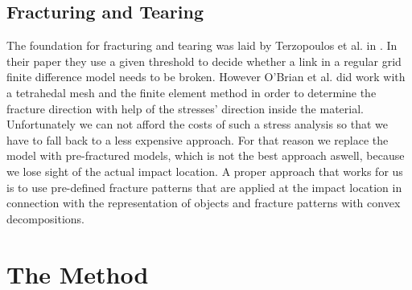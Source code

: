 \documentclass[
	11pt, 
	DIV10,
	a4paper, 
	oneside, 
	headings=normal, 
	captions=tableheading,
	final, 
	numbers=noenddot
]{scrartcl}
\begin{document}
\subsection{Fracturing and Tearing}
	The foundation for fracturing and tearing was laid by Terzopoulos et al. in \cite{5}. In their paper they use a given threshold to decide whether a link in a regular grid finite difference model needs to be broken. However O'Brian et al. did work with a tetrahedal mesh and the finite element method in order to determine the fracture direction with help of the stresses' direction inside the material. Unfortunately we can not afford the costs of such a stress analysis so that we have to fall back to a less expensive approach. For that reason we replace the model with pre-fractured models, which is not the best approach aswell, because we lose sight of the actual impact location. A proper approach that works for us is to use pre-defined fracture patterns that are applied at the impact location in connection with the representation of objects and fracture patterns with convex decompositions.\cite{15}
	\newpage
\section{The Method}
\end{document}
